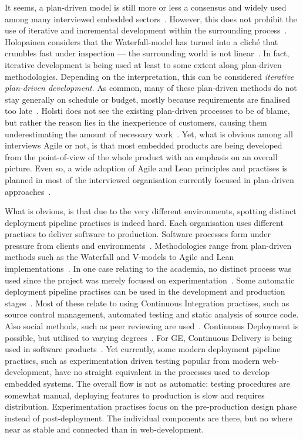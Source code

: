 \documentclass[english]{tktltiki2}
\begin{document}
It seems, a plan-driven model is still more or less a consensus and widely used among many interviewed embedded sectors~\cite{Hol15b, Koi15}. However, this does not prohibit the use of iterative and incremental development within the surrounding process~\cite{Hol15b}. Holopainen considers that the Waterfall-model has turned into a cliché that crumbles fast under inspection — the surrounding world is not linear~\cite{Hol15a}. In fact, iterative development is being used at least to some extent along plan-driven methodologies. Depending on the interpretation, this can be considered \emph{iterative plan-driven development}. As common, many of these plan-driven methods do not stay generally on schedule or budget, mostly because requirements are finalised too late~\cite{Hol15b}. Holsti does not see the existing plan-driven processes to be of blame, but rather the reason lies in the inexperience of customers, causing them underestimating the amount of necessary work~\cite{Hol15b}. Yet, what is obvious among all interviews Agile or not, is that most embedded products are being developed from the point-of-view of the whole product with an emphasis on an overall picture. Even so, a wide adoption of Agile and Lean principles and practises is planned in most of the interviewed organisation currently focused in plan-driven approaches~\cite{Koi15}.

What is obvious, is that due to the very different environments, spotting distinct deployment pipeline practises is indeed hard. Each organisation uses different practises to deliver software to production. Software processes form under pressure from clients and environments~\cite{Hol15a, Hol15b, Koi15}. Methodologies range from plan-driven methods such as the Waterfall and V-models to Agile and Lean implementations~\cite{BT15, Hol15a, Hol15b, Koi15, Pet15}. In one case relating to the academia, no distinct process was used since the project was merely focused on experimentation~\cite{Kri15}. Some automatic deployment pipeline practises can be used in the development and production stages~\cite{BT15, Hol15a, Hol15b, Koi15, Pet15}. Most of these relate to using Continuous Integration practises, such as source control management, automated testing and static analysis of source code. Also social methods, such as peer reviewing are used~\cite{Hol15b}. Continuous Deployment is possible, but utilised to varying degrees~\cite{BT15, Hol15a, Hol15b, Koi15, Pet15}. For GE, Continuous Delivery is being used in software products~\cite{BT15}. Yet currently, some modern deployment pipeline practises, such as experimentation driven testing popular from modern web-development, have no straight equivalent in the processes used to develop embedded systems. The overall flow is not as automatic: testing procedures are somewhat manual, deploying features to production is slow and requires distribution. Experimentation practises focus on the pre-production design phase instead of post-deployment. The individual components are there, but no where near as stable and connected than in web-development.
\end{document}
